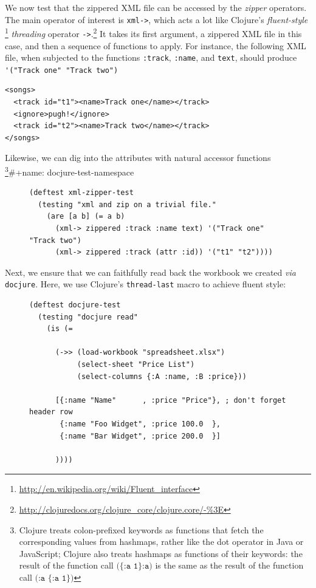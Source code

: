 \documentclass[11pt]{article}
\begin{document}
We now test that the zippered XML file can be accessed by the \emph{zipper}
operators. The main operator of interest is \verb|xml->|, which acts
a lot like Clojure's
\emph{fluent-style} \footnote{\url{http://en.wikipedia.org/wiki/Fluent_interface}}
\emph{threading} operator
\verb|->|.\footnote{\url{http://clojuredocs.org/clojure_core/clojure.core/-\%3E}}
It takes its first argument, a zippered XML file in this case, and
then a sequence of functions to apply. For instance, the following
XML file, when subjected to the functions \verb|:track|,
\verb|:name|, and \verb|text|, should produce \verb|'("Track one" "Track two")|
\begin{verbatim}
<songs>
  <track id="t1"><name>Track one</name></track>
  <ignore>pugh!</ignore>
  <track id="t2"><name>Track two</name></track>
</songs>
\end{verbatim}
Likewise, we can dig into the attributes with natural accessor
functions \footnote{Clojure treats colon-prefixed keywords as functions that
fetch the corresponding values from hashmaps, rather like the dot
operator in Java or JavaScript; Clojure also treats hashmaps as
functions of their keywords: the result of the function call
$\texttt{(\{:a 1\} :a)}$ is the same as the result of the function call
$\texttt{(:a \{:a 1\})}$}\#+name: docjure-test-namespace

\begin{figure}[H]
\label{test-zippered}
\begin{verbatim}
(deftest xml-zipper-test
  (testing "xml and zip on a trivial file."
    (are [a b] (= a b)
      (xml-> zippered :track :name text) '("Track one" "Track two")
      (xml-> zippered :track (attr :id)) '("t1" "t2"))))
\end{verbatim}
\end{figure}

Next, we ensure that we can faithfully read back the workbook we
created \emph{via} \verb|docjure|. Here, we use Clojure's
\verb|thread-last| macro to achieve fluent style:
\begin{figure}[H]
\label{test-docjure-read}
\begin{verbatim}
(deftest docjure-test
  (testing "docjure read"
    (is (= 

      (->> (load-workbook "spreadsheet.xlsx")
           (select-sheet "Price List")
           (select-columns {:A :name, :B :price}))

      [{:name "Name"      , :price "Price"}, ; don't forget header row
       {:name "Foo Widget", :price 100.0  },
       {:name "Bar Widget", :price 200.0  }]

      ))))
\end{verbatim}
\end{figure}
\end{document}
